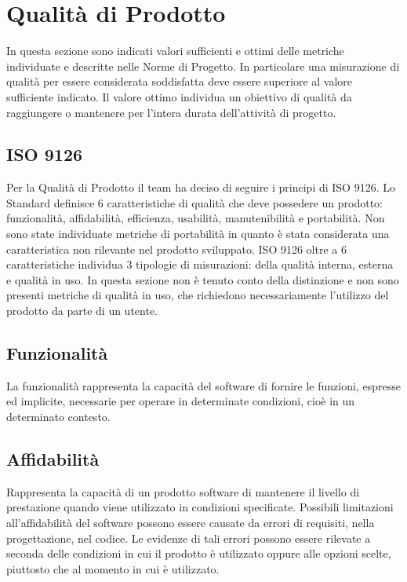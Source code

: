 \section{Qualità di Prodotto}
In questa sezione sono indicati valori sufficienti e ottimi delle metriche individuate e descritte nelle Norme di Progetto.
In particolare una misurazione di qualità per essere considerata soddisfatta deve essere superiore al valore sufficiente indicato. 
Il valore ottimo individua un obiettivo di qualità da raggiungere o mantenere per l'intera durata dell'attività di progetto.
\subsection{ISO 9126}
Per la Qualità di Prodotto il team ha deciso di seguire i principi di ISO 9126.
Lo Standard definisce 6 caratteristiche di qualità che deve possedere un prodotto: funzionalità, affidabilità, efficienza, usabilità, manutenibilità e portabilità. 
Non sono state individuate metriche di portabilità in quanto è stata considerata una caratteristica non rilevante nel prodotto sviluppato. 
ISO 9126 oltre a 6 caratteristiche individua 3 tipologie di misurazioni: della qualità interna, esterna e qualità in uso. 
In questa sezione non è tenuto conto della distinzione e non sono presenti metriche di qualità in uso, che richiedono necessariamente l'utilizzo del prodotto da parte di un utente.

\subsection{Funzionalità}
La funzionalità rappresenta la capacità del software di fornire le funzioni, espresse ed implicite, necessarie per operare in determinate condizioni, cioè in un determinato contesto.
\def\productquality{
    {
        Correttezza dello scambio dei dati,
        $N_{err} = \#\ di\ errori$, 
        -,
        $N_{err} = 0$,
        un valore sufficiente sarà deciso in fasi successive del progetto
    },
}


\subsection{Affidabilità}
Rappresenta la capacità di un prodotto software di mantenere il livello di prestazione quando viene utilizzato in condizioni specificate. Possibili limitazioni all'affidabilità del software possono essere causate da errori di requisiti, nella progettazione, nel codice. Le evidenze di tali errori possono essere rilevate a seconda delle condizioni in cui il prodotto è utilizzato oppure alle opzioni scelte, piuttosto che al momento in cui è utilizzato.
\def\productquality{
    {
        Densità di errori,
        $E_{density} = N_{err}/SLOC$, 
        -,
        -,
        è stato ritenuto prematuro definire valori sufficienti e ottimi per la metrica
    },
}


